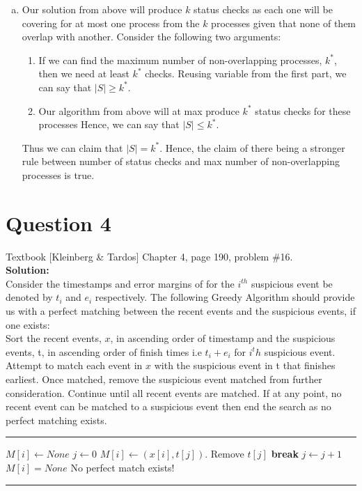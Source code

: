 \documentclass[11pt]{article}
\makeatletter
\newcommand{\Break}{\State \textbf{break} }
\newenvironment{breakablealgorithm}
{%
	\begin{center}
		\refstepcounter{algorithm}%
		\hrule height.8pt depth0pt \kern2pt%
		\renewcommand{\caption}[2][\relax]{%
			{\raggedright\textbf{\ALG@name~\thealgorithm} ##2\par}%
			\ifx\relax##1\relax %
			\addcontentsline{loa}{algorithm}{\protect\numberline{\thealgorithm}##2}%
			\else %
			\addcontentsline{loa}{algorithm}{\protect\numberline{\thealgorithm}##1}%
			\fi
			\kern2pt\hrule\kern2pt
		}
	}{%
		\kern2pt\hrule\relax%
	\end{center}
}
\makeatother
\begin{document}
\begin{enumerate}[(a)]
\item Our solution from above will produce $ k $ status checks as each one will be covering for at most one process from the $ k $ processes given that none of them overlap with another. Consider the following two arguments:
\begin{enumerate}
	\item If we can find the maximum number of non-overlapping processes, $ k^* $, then we need at least $ k^* $ checks. Reusing variable from the first part, we can say that $ |S| \geq k^* $. 
	\item Our algorithm from above will at max produce $ k^* $ status checks for these processes Hence, we can say that $|S| \leq k^*$.
\end{enumerate}
Thus we can claim that $ |S| = k^* $. Hence, the claim of there being a stronger rule between number of status checks and max number of non-overlapping processes is true.
\end{enumerate}

\clearpage
\section{Question 4} Textbook [Kleinberg \& Tardos] Chapter 4, page 190, problem \#16. \\
\textbf{Solution:} \\

Consider the timestamps and error margins of for the $ i^{th} $ suspicious event be denoted by $ t_i $ and $ e_i $ respectively. The following Greedy Algorithm should provide us with a perfect matching between the recent events and the suspicious events, if one exists: \\

Sort the recent events, $ x $, in ascending order of timestamp and the suspicious events, t, in ascending order of finish times i.e $ t_i+e_i $ for $ i^th $ suspicious event. Attempt to match each event in $ x $ with the suspicious event in t that finishes earliest. Once matched, remove the suspicious event matched from further consideration. Continue until all recent events are matched. If at any point, no recent event can be matched to a suspicious event then end the search as no perfect matching exists.

\begin{breakablealgorithm}
	\begin{algorithmic}[1]
			\State $M[i] \gets None$
			\State $ j \gets 0$
					\State $ M[i] \gets (x[i], t[j])$.
					\State Remove $ t[j] $
					\Break
				\EndIf
				\State $ j \gets j+1$
			\EndWhile
			\If $M[i] = None$
				\State \Return No perfect match exists!
			\EndIf
		\EndFor
	\end{algorithmic}
\end{breakablealgorithm}
\end{document}
